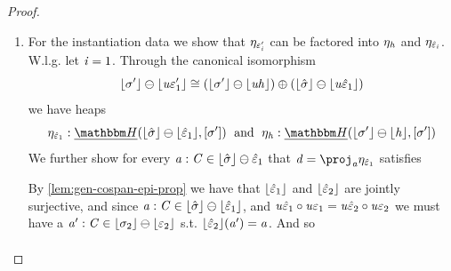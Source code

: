 \begin{proof}
\begin{enumerate}
\begin{center}
              \end{center}
              That $\tinstU\hat\me_1 \comp \tinstU\me_1 = \tinstU\hat\me_2 \comp \tinstU\me_2$ follows from the outer square and inner triangles commuting.
        \item For the instantiation data we show that $\eta_{\varepsilon_{\mathit{i}}'}$ can be factored into $\eta_{\mathit{h}}$ and $\eta_{\hat{\varepsilon}_{\mathit{i}}}$. 
              W.l.g. let $\mathit{i} = 1$.
              Through the canonical isomorphism
              \[ \lfloor\sigma'\rfloor \ominus \lfloor\mathit{u}\varepsilon_1'\rfloor \cong (\lfloor\sigma'\rfloor \ominus \lfloor\mathit{u}\mathit{h}\rfloor) \oplus (\lfloor\hat\sigma\rfloor \ominus \lfloor\mathit{u}\hat{\varepsilon}_1\rfloor) \]
              we have heaps
\[ \mvarM_{\hat\me_1} : \dheapF(\concL{\hat\sigma} \ominus \concL{\hat\me_1}, \anyL{\sigma'}) \;\text{ and }\; \mvarM_\vh : \dheapF(\concL{\sigma'} \ominus \concL\vh, \anyL{\sigma'}) \]
              We further show for every $\mathit{a} : \mathit{C} \in \lfloor\hat\sigma\rfloor \ominus \hat{\varepsilon}_1$ that $\vd = \proj_\va \mvarM_{\hat\me_1}$ satisfies
              \begin{center}
              \end{center}
              By \cref{lem:gen-cospan-epi-prop} we have that $\lfloor\hat{\varepsilon}_1\rfloor$ and $\lfloor\hat{\varepsilon}_2\rfloor$ are jointly surjective, 
              and since $\mathit{a} : \mathit{C} \in \lfloor\hat\sigma\rfloor \ominus \lfloor\hat{\varepsilon}_1\rfloor$, and $\mathit{u}\hat{\varepsilon}_1 \circ \mathit{u}\varepsilon_1 = \mathit{u}\hat{\varepsilon}_2 \circ \mathit{u}\varepsilon_2$ we must have a $\mathit{a}' : \mathit{C} \in \lfloor\sigma_2\rfloor \ominus \lfloor\varepsilon_2\rfloor$ s.t. $\lfloor\hat{\varepsilon}_2\rfloor(\mathit{a}') = \mathit{a}$.
              And so
              \begin{align*}

\end{align*}
\end{enumerate}
\end{proof}
